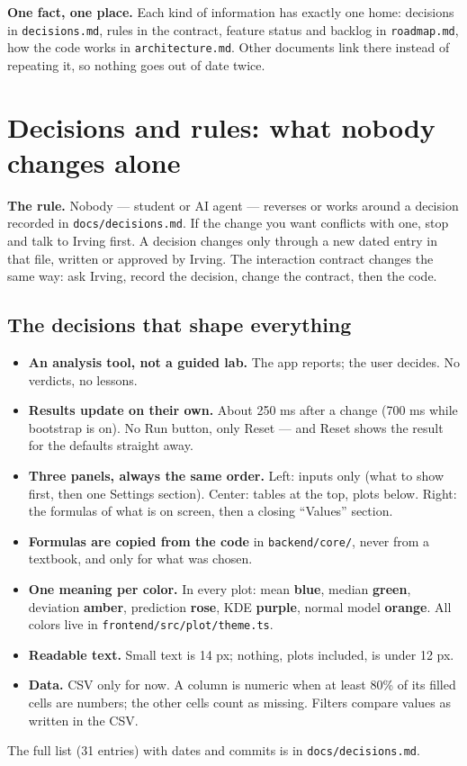 \documentclass[11pt,a4paper]{article}
\newcommand{\f}[1]{\texttt{#1}}
\begin{document}
\begin{note}
\textbf{One fact, one place.} Each kind of information has exactly one home: decisions in
\f{decisions.md}, rules in the contract, feature status and backlog in \f{roadmap.md}, how the code works in
\f{architecture.md}. Other documents link there instead of repeating it, so nothing goes out of date twice.
\end{note}

\section{Decisions and rules: what nobody changes alone}

\begin{rulebox}
\textbf{The rule.} Nobody — student or AI agent — reverses or works around a decision recorded in
\f{docs/decisions.md}. If the change you want conflicts with one, stop and talk to Irving first. A decision
changes only through a new dated entry in that file, written or approved by Irving. The interaction contract
changes the same way: ask Irving, record the decision, change the contract, then the code.
\end{rulebox}

\subsection*{The decisions that shape everything}
\begin{itemize}
\item \textbf{An analysis tool, not a guided lab.} The app reports; the user decides. No verdicts, no lessons.
\item \textbf{Results update on their own.} About 250 ms after a change (700 ms while bootstrap is on). No Run
  button, only Reset — and Reset shows the result for the defaults straight away.
\item \textbf{Three panels, always the same order.} Left: inputs only (what to show first, then one Settings
  section). Center: tables at the top, plots below. Right: the formulas of what is on screen, then a closing
  ``Values'' section.
\item \textbf{Formulas are copied from the code} in \f{backend/core/}, never from a textbook, and only for what
  was chosen.
\item \textbf{One meaning per color.} In every plot: mean {\color{blue}\textbf{blue}}, median
  {\color{green}\textbf{green}}, deviation {\color{amber}\textbf{amber}}, prediction {\color{rose}\textbf{rose}},
  KDE {\color{purple}\textbf{purple}}, normal model {\color{orange}\textbf{orange}}. All colors live in
  \f{frontend/src/plot/theme.ts}.
\item \textbf{Readable text.} Small text is 14 px; nothing, plots included, is under 12 px.
\item \textbf{Data.} CSV only for now. A column is numeric when at least 80\% of its filled cells are numbers;
  the other cells count as missing. Filters compare values as written in the CSV.
\end{itemize}
The full list (31 entries) with dates and commits is in \f{docs/decisions.md}.
\end{document}
